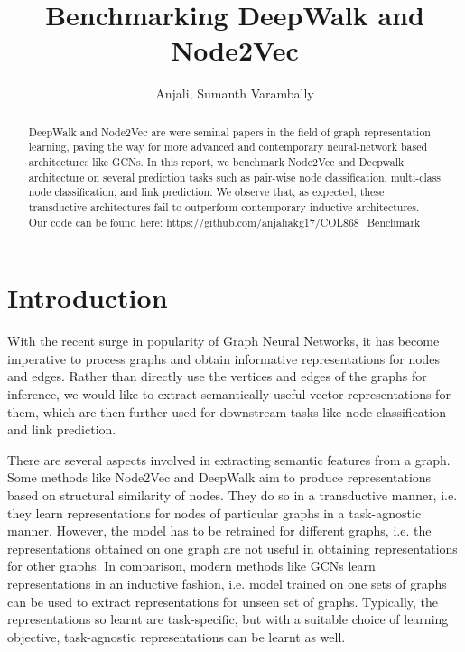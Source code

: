 \documentclass[sigconf]{acmart}
\begin{document}
\title{Benchmarking DeepWalk and Node2Vec}
\author{Anjali, Sumanth Varambally}
\begin{abstract}
DeepWalk and Node2Vec are were seminal papers in the field of graph representation learning, paving the way for more advanced and contemporary neural-network based architectures like GCNs. In this report, we benchmark Node2Vec and Deepwalk architecture on several prediction tasks such as pair-wise node classification, multi-class node classification, and link prediction. We observe that, as expected, these transductive architectures fail to outperform contemporary inductive architectures. Our code can be found here: \url{https://github.com/anjaliakg17/COL868_Benchmark}
\end{abstract}
\maketitle

\section{Introduction}
With the recent surge in popularity of Graph Neural Networks, it has become imperative to process graphs and obtain informative representations for nodes and edges. Rather than directly use the vertices and edges of the graphs for inference, we would like to extract semantically useful vector representations for them, which are then further used for downstream tasks like node classification and link prediction. 

There are several aspects involved in extracting semantic features from a graph. Some methods like Node2Vec and DeepWalk aim to produce representations based on structural similarity of nodes. They do so in a transductive manner, i.e. they learn representations for nodes of particular graphs in a task-agnostic manner. However, the model has to be retrained for different graphs, i.e. the representations obtained on one graph are not useful in obtaining representations for other graphs. In comparison, modern methods like GCNs learn representations in an inductive fashion, i.e. model trained on one sets of graphs can be used to extract representations for unseen set of graphs. Typically, the representations so learnt are task-specific, but with a suitable choice of learning objective, task-agnostic representations can be learnt as well.
\end{document}
